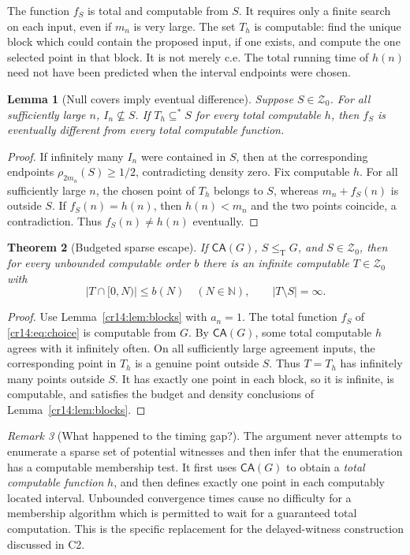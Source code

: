 \documentclass[11pt,a4paper]{article}
\newcommand{\N}{\mathbb N}
\newcommand{\leT}{\leq_{\mathrm T}}
\newcommand{\Znull}{\mathcal Z_0}
\newcommand{\substar}{\subseteq^{*}}
\newcommand{\CA}{\mathsf{CA}}
\newtheorem{theorem}{Theorem}[section]
\newtheorem{lemma}[theorem]{Lemma}
\theoremstyle{definition}
\theoremstyle{remark}
\newtheorem{remark}[theorem]{Remark}
\begin{document}
The function $f_S$ is total and computable from $S$. It requires only a
finite search on each input, even if $m_n$ is very large. The set $T_h$ is
computable: find the unique block which could contain the proposed input,
if one exists, and compute the one selected point in that block. It is not
merely c.e. The total running time of $h(n)$ need not have been predicted
when the interval endpoints were chosen.

\begin{lemma}[Null covers imply eventual difference]\label{cr14:lem:cover}
Suppose $S\in\Znull$. For all sufficiently large $n$, $I_n\nsubseteq S$.
If $T_h\substar S$ for every total computable $h$, then $f_S$ is eventually
different from every total computable function.
\end{lemma}
\begin{proof}
If infinitely many $I_n$ were contained in $S$, then at the corresponding
endpoints $\rho_{2m_n}(S)\geq1/2$, contradicting density zero.
Fix computable $h$. For all sufficiently large $n$, the chosen point of
$T_h$ belongs to $S$, whereas $m_n+f_S(n)$ is outside $S$.
If $f_S(n)=h(n)$, then $h(n)<m_n$ and the two points coincide, a
contradiction. Thus $f_S(n)\ne h(n)$ eventually.
\end{proof}

\begin{theorem}[Budgeted sparse escape]\label{cr14:thm:escape}
If $\CA(G)$, $S\leT G$, and $S\in\Znull$, then for every unbounded
computable order $b$ there is an infinite computable $T\in\Znull$ with
\begin{equation}\label{cr14:eq:escapebudget}
 |T\cap[0,N)|\leq b(N)\quad(N\in\N),\qquad |T\setminus S|=\infty.
\end{equation}
\end{theorem}
\begin{proof}
Use Lemma~\ref{cr14:lem:blocks} with $a_n=1$. The total function $f_S$ of
\eqref{cr14:eq:choice} is computable from $G$. By $\CA(G)$, some total
computable $h$ agrees with it infinitely often. On all sufficiently large
agreement inputs, the corresponding point in $T_h$ is a genuine point
outside $S$. Thus $T=T_h$ has infinitely many points outside $S$.
It has exactly one point in each block, so it is infinite, is computable,
and satisfies the budget and density conclusions of Lemma~\ref{cr14:lem:blocks}.
\end{proof}

\begin{remark}[What happened to the timing gap?]\label{cr14:rem:timing}
The argument never attempts to enumerate a sparse set of potential witnesses
and then infer that the enumeration has a computable membership test. It
first uses $\CA(G)$ to obtain a \emph{total computable function} $h$, and
then defines exactly one point in each computably located interval.
Unbounded convergence times cause no difficulty for a membership algorithm
which is permitted to wait for a guaranteed total computation. This is the
specific replacement for the delayed-witness construction discussed in C2.
\end{remark}
\end{document}
